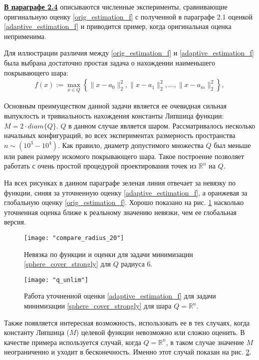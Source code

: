 \underline{\textbf{В параграфе 2.4}} описываются численные эксперименты, сравнивающие оригинальную оценку \eqref{orig_estimation_f} с полученной в параграфе 2.1 оценкой \eqref{adaptive_estimation_f} и приводится пример, когда оригинальная оценка неприменима. 

Для иллюстрации различия между \eqref{orig_estimation_f} и \eqref{adaptive_estimation_f} была выбрана достаточно простая задача о нахождении наименьшего покрывающего шара:
\begin{gather}\label{sphere_cover_strongly}
    f(x) := \max_{x\in Q}\left\{\|x - a_0\|_2^2, \|x - a_1\|_2^2, ..., \|x - a_m\|_2^2\right\},
\end{gather}

Основным преимуществом данной задачи является ее очевидная сильная выпуклость и тривиальность нахождения константы Липшица функции: $ M = 2 \cdot diam\{Q\} $. $Q$ в данном случае является шаром.
Рассматривалось несколько начальных конфигураций, во всех экспериментах размерность пространства $n \sim (10^3 - 10^4)$. Как правило, диаметр допустимого множества $Q$ был меньше или равен размеру искомого покрывающего шара. Такое построение позволяет работать с очень простой процедурой проектирования точек из $\mathbb{R}^n$ на $Q$.

На всех рисунках в данном параграфе зеленая линия отвечает за невязку по функции, синяя за уточненную оценку \eqref{adaptive_estimation_f}, а оранжевая за глобальную оценку \eqref{orig_estimation_f}. Хорошо показано на рис. \ref{r_20_q_6} насколько уточненная оценка ближе к реальному значению невязки, чем ее глобальная версия. 

\begin{figure}[h]
	\centering
	\texttt{[image: "compare\_radius\_20"]}
    \caption{Невязка по функции и оценки для задачи минимизации \eqref{sphere_cover_strongly} для $Q$ радиуса 6.}
    \label{r_20_q_6}
\end{figure}

\begin{figure}[h]
	\centering
	\texttt{[image: "q\_unlim"]}
    \caption{Работа уточненной оценки \eqref{adaptive_estimation_f} для задачи минимизации \eqref{sphere_cover_strongly} для шара $Q = \mathbb{R}^n$.}
    \label{q_unlim}
\end{figure}

Также появляется интересная возможность, использовать ее в тех случаях, когда константу Липшица ($M$) целевой функции невозможно или сложно оценить. В качестве примера используется случай, когда $Q = \mathbb{R}^n$, в таком случае значение $M$ неограниченно и уходит в бесконечность. Именно этот случай показан на рис. \ref{q_unlim}. 

